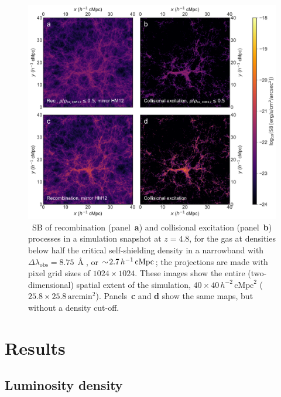\begin{figure}
    \centering
    \includegraphics[width=\linewidth]{"Plots/ChapterP/Recombination_collisional_excitation_maps"}
    \caption[\lya\ surface brightness of recombination and collisional excitation processes at $z=4.8$.]
    {\lya\ SB of recombination (panel~\textbf{a}) and collisional excitation (panel~\textbf{b}) processes in a simulation snapshot at $z=4.8$, for the gas at densities below half the critical self-shielding density in a narrowband with $\Delta \lambda_\text{obs} = 8.75 \, \Angstrom$, or $\sim \! 2.7 \, h^{-1} \, \mathrm{cMpc}$; the projections are made with pixel grid sizes of $1024 \times 1024$. These images show the entire (two-dimensional) spatial extent of the simulation, $40 \times 40 \, h^{-2} \, \mathrm{cMpc}^2$ ($25.8 \times 25.8 \, \mathrm{arcmin}^2$). Panels~\textbf{c} and \textbf{d} show the same maps, but without a density cut-off.}
    \label{chPfig:SBrecexc}
\end{figure}

\section{Results}
\label{chPsec:Results}

\subsection{Luminosity density}
\label{chPssec:Luminosity density}

